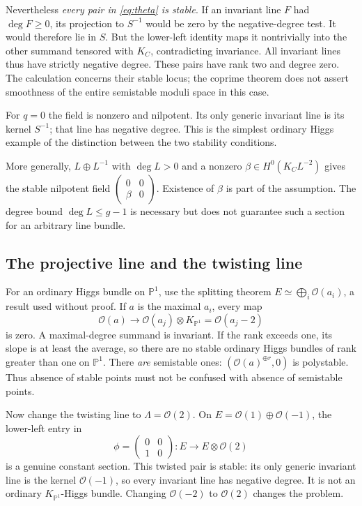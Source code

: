 \documentclass[11pt,a4paper]{article}
\numberwithin{equation}{section}
\theoremstyle{definition}
\newcommand{\OO}{\mathcal O}
\newcommand{\PP}{\mathbb P}
\begin{document}
Nevertheless \emph{every pair in \eqref{eq:theta} is stable}.
If an invariant line $F$ had $\deg F\ge0$, its projection to $S^{-1}$
would be zero by the negative-degree test. It would therefore lie in
$S$. But the lower-left identity maps it nontrivially into the other
summand tensored with $K_C$, contradicting invariance. All invariant
lines thus have strictly negative degree.
These pairs have rank two and degree zero. The calculation concerns
their stable locus; the coprime theorem does not assert smoothness
of the entire semistable moduli space in this case.

For $q=0$ the field is nonzero and nilpotent. Its only generic invariant
line is its kernel $S^{-1}$; that line has negative degree. This is
the simplest ordinary Higgs example of the distinction between the
two stability conditions.

More generally, $L\oplus L^{-1}$ with $\deg L>0$ and a nonzero
$\beta\in H^0(K_C L^{-2})$ gives the stable nilpotent field
$\left(\begin{smallmatrix}0&0\\\beta&0\end{smallmatrix}\right)$.
Existence of $\beta$ is part of the assumption. The degree bound
$\deg L\le g-1$ is necessary but does not guarantee such a section
for an arbitrary line bundle.

\subsection{The projective line and the twisting line}
For an ordinary Higgs bundle on $\PP^1$, use the splitting theorem
$E\simeq\bigoplus_i\OO(a_i)$, a result used without proof.
If $a$ is the maximal $a_i$, every map
\[
 \OO(a)\longrightarrow\OO(a_j)\otimes K_{\PP^1}
 =\OO(a_j-2)
\]
is zero. A maximal-degree summand is invariant. If the rank exceeds
one, its slope is at least the average, so there are no stable ordinary
Higgs bundles of rank greater than one on $\PP^1$.
There \emph{are} semistable ones: $(\OO(a)^{\oplus r},0)$ is polystable.
Thus absence of stable points must not be confused with absence of
semistable points.

Now change the twisting line to $\Lambda=\OO(2)$. On
$E=\OO(1)\oplus\OO(-1)$, the lower-left entry in
\[
 \phi=\begin{pmatrix}0&0\\1&0\end{pmatrix}:E\to E\otimes\OO(2)
\]
is a genuine constant section. This twisted pair is stable: its only
generic invariant line is the kernel $\OO(-1)$, so every invariant
line has negative degree. It is not an ordinary $K_{\PP^1}$-Higgs
bundle. Changing $\OO(-2)$ to $\OO(2)$ changes the problem.
\end{document}
